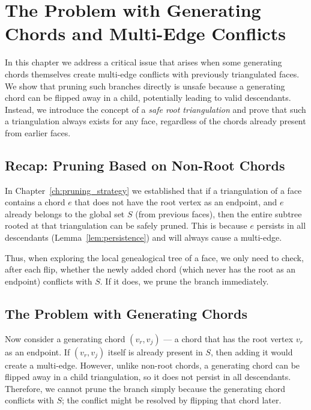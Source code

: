 
\chapter{The Problem with Generating Chords and Multi-Edge Conflicts}
\label{ch:generating_chord_conflicts}

In this chapter we address a critical issue that arises when some generating chords themselves create multi-edge conflicts with previously triangulated faces. 
We show that pruning such branches directly is unsafe because a generating chord can be flipped away in a child, potentially leading to valid descendants. 
Instead, we introduce the concept of a \emph{safe root triangulation} and prove that such a triangulation always exists for any face, regardless of the chords already present from earlier faces.

\section{Recap: Pruning Based on Non-Root Chords}
\label{sec:recap_pruning}

In Chapter~\ref{ch:pruning_strategy} we established that if a triangulation of a face contains a chord \(e\) that does not have the root vertex as an endpoint, and \(e\) already belongs to the global set \(S\) (from previous faces), then the entire subtree rooted at that triangulation can be safely pruned. 
This is because \(e\) persists in all descendants (Lemma~\ref{lem:persistence}) and will always cause a multi-edge.

Thus, when exploring the local genealogical tree of a face, we only need to check, after each flip, whether the newly added chord (which never has the root as an endpoint) conflicts with \(S\). 
If it does, we prune the branch immediately.

\section{The Problem with Generating Chords}
\label{sec:generating_chord_problem}

Now consider a generating chord \((v_r, v_j)\) — a chord that has the root vertex \(v_r\) as an endpoint. 
If \((v_r, v_j)\) itself is already present in \(S\), then adding it would create a multi-edge. 
However, unlike non-root chords, a generating chord can be flipped away in a child triangulation, so it does not persist in all descendants. 
Therefore, we cannot prune the branch simply because the generating chord conflicts with \(S\); the conflict might be resolved by flipping that chord later.

